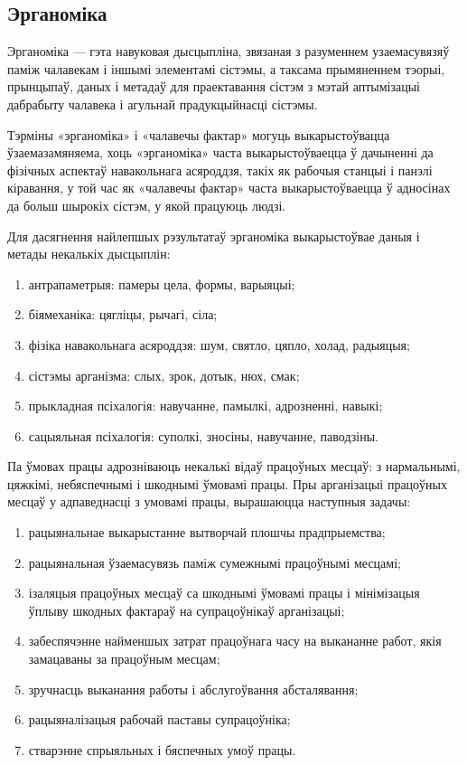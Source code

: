 \subsection{Эрганоміка}

Эрганоміка --- гэта навуковая дысцыпліна, звязаная з разуменнем узаемасувязяў паміж чалавекам і іншымі элементамі сістэмы, а таксама прымяненнем тэорыі, прынцыпаў, даных і метадаў для праектавання сістэм з мэтай аптымізацыі дабрабыту чалавека і агульнай прадукцыйнасці сістэмы.

Тэрміны «эрганоміка» і «чалавечы фактар» могуць выкарыстоўвацца ўзаемазамяняема, хоць «эрганоміка» часта выкарыстоўваецца ў дачыненні да фізічных аспектаў навакольнага асяроддзя, такіх як рабочыя станцыі і панэлі кіравання, у той час як «чалавечы фактар» часта выкарыстоўваецца ў адносінах да больш шырокіх сістэм, у якой працуюць людзі.

Для дасягнення найлепшых рэзультатаў эрганоміка выкарыстоўвае даныя і метады некалькіх дысцыплін:
\begin{enumerate}
    \item антрапаметрыя: памеры цела, формы, варыяцыі;
    \item біямеханіка: цягліцы, рычагі, сіла;
    \item фізіка навакольнага асяроддзя: шум, святло, цяпло, холад, радыяцыя;
    \item сістэмы арганізма: слых, зрок, дотык, нюх, смак;
    \item прыкладная псіхалогія: навучанне, памылкі, адрозненні, навыкі;
    \item сацыяльная псіхалогія: суполкі, зносіны, навучанне, паводзіны.
\end{enumerate}

Па ўмовах працы адрозніваюць некалькі відаў працоўных месцаў: з нармальнымі, цяжкімі, небяспечнымі і шкоднымі ўмовамі працы. Пры арганізацыі працоўных месцаў у адпаведнасці з умовамі працы, вырашаюцца наступныя задачы:
\begin{enumerate}
    \item рацыянальнае выкарыстанне вытворчай плошчы прадпрыемства;
    \item рацыянальная ўзаемасувязь паміж сумежнымі працоўнымі месцамі;
    \item ізаляцыя працоўных месцаў са шкоднымі ўмовамі працы і мінімізацыя ўплыву шкодных фактараў на супрацоўнікаў арганізацыі;
    \item забеспячэнне найменшых затрат працоўнага часу на выкананне работ, якія замацаваны за працоўным месцам;
    \item зручнасць выканання работы і абслугоўвання абсталявання;
    \item рацыяналізацыя рабочай паставы супрацоўніка;
    \item стварэнне спрыяльных і бяспечных умоў працы.
\end{enumerate}

